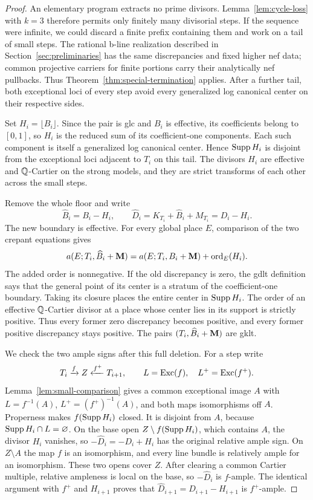 \begin{proof}
An elementary program extracts no prime divisors.  Lemma~\ref{lem:cycle-loss} with \(k=3\)
therefore permits only finitely many divisorial steps.  If the sequence were
infinite, we could discard a finite prefix containing them and work on a
tail of small steps.
The rational b-line realization described in
Section~\ref{sec:preliminaries} has the same discrepancies and fixed higher
nef data; common projective carriers for finite portions carry their
analytically nef pullbacks.  Thus Theorem~\ref{thm:special-termination}
applies.  After a further tail, both exceptional loci of every step avoid
every generalized log canonical center on their respective sides.

Set \(H_i=\lfloor B_i\rfloor\).  Since the pair is glc and \(B_i\) is
effective, its coefficients belong to \([0,1]\), so \(H_i\) is the reduced
sum of its coefficient-one components.  Each such component is itself a
generalized log canonical center.  Hence \(\operatorname{Supp} H_i\) is disjoint from
the exceptional loci adjacent to \(T_i\) on this tail.  The divisors
\(H_i\) are effective and \(\mathbb{Q}\)-Cartier on the strong models, and they
are strict transforms of each other across the small steps.

Remove the whole floor and write
\[
 \widehat B_i=B_i-H_i,
 \qquad \widehat D_i=K_{T_i}+\widehat B_i+M_{T_i}=D_i-H_i.
\]
The new boundary is effective.  For every global place \(E\), comparison
of the two crepant equations gives
\begin{equation}\label{eq:full-floor-deletion}
 a(E;T_i,\widehat B_i+\mathbf{M})
 =a(E;T_i,B_i+\mathbf{M})+\operatorname{ord}_E(H_i).
\end{equation}
The added order is nonnegative.  If the old discrepancy is zero, the gdlt
definition says that the general point of its center is a stratum of the
coefficient-one boundary.  Taking its closure places the entire center in
\(\operatorname{Supp} H_i\).  The order of an effective \(\mathbb{Q}\)-Cartier divisor at a
place whose center lies in its support is strictly positive.  Thus every
former zero discrepancy becomes positive, and every former positive
discrepancy stays positive.  The pairs \((T_i,\widehat B_i+\mathbf{M})\) are gklt.

We check the two ample signs after this full deletion.  For a step write
\[
 T_i\xrightarrow{f}Z\xleftarrow{f^+}T_{i+1},
 \qquad L=\operatorname{Exc}(f),\quad L^+=\operatorname{Exc}(f^+).
\]
Lemma~\ref{lem:small-comparison} gives a common exceptional image \(A\)
with \(L=f^{-1}(A)\), \(L^+=(f^+)^{-1}(A)\), and both maps isomorphisms
off \(A\).  Properness makes \(f(\operatorname{Supp} H_i)\) closed.  It is disjoint from
\(A\), because \(\operatorname{Supp} H_i\cap L=\varnothing\).  On the base open
\(Z\setminus f(\operatorname{Supp} H_i)\), which contains \(A\), the divisor \(H_i\)
vanishes, so \(-\widehat D_i=-D_i+H_i\) has the original relative ample
sign.  On \(Z\setminus A\) the map \(f\) is an isomorphism, and every line
bundle is relatively ample for an isomorphism.  These two opens cover
\(Z\).  After clearing a common Cartier multiple, relative ampleness is
local on the base, so \(-\widehat D_i\) is \(f\)-ample.  The identical
argument with \(f^+\) and \(H_{i+1}\) proves that
\(\widehat D_{i+1}=D_{i+1}-H_{i+1}\) is \(f^+\)-ample.


\end{proof}
